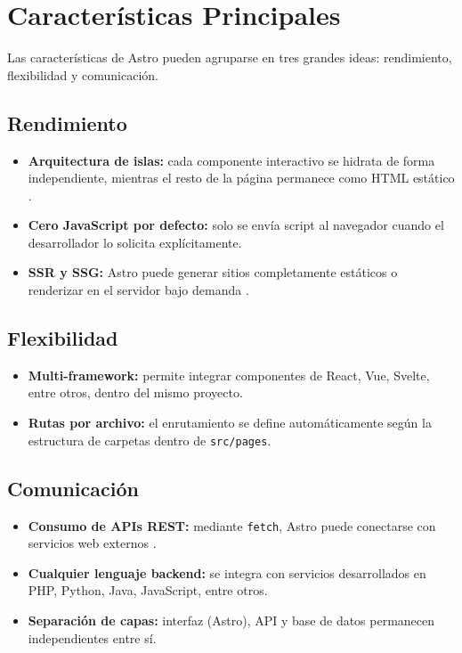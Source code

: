 \documentclass[12pt]{article}
\begin{document}
\section{Características Principales}

Las características de Astro pueden agruparse en tres grandes ideas: rendimiento, flexibilidad y comunicación.

\subsection{Rendimiento}

\begin{itemize}[leftmargin=*]
  \item \textbf{Arquitectura de islas:} cada componente interactivo se hidrata de forma independiente, mientras el resto de la página permanece como HTML estático \parencite{vepsalainen2023rise}.
  \item \textbf{Cero JavaScript por defecto:} solo se envía script al navegador cuando el desarrollador lo solicita explícitamente.
  \item \textbf{SSR y SSG:} Astro puede generar sitios completamente estáticos o renderizar en el servidor bajo demanda \parencite{iop2020rendering}.
\end{itemize}

\subsection{Flexibilidad}

\begin{itemize}[leftmargin=*]
  \item \textbf{Multi-framework:} permite integrar componentes de React, Vue, Svelte, entre otros, dentro del mismo proyecto.
  \item \textbf{Rutas por archivo:} el enrutamiento se define automáticamente según la estructura de carpetas dentro de \texttt{src/pages}.
\end{itemize}

\subsection{Comunicación}

\begin{itemize}[leftmargin=*]
  \item \textbf{Consumo de APIs REST:} mediante \texttt{fetch}, Astro puede conectarse con servicios web externos \parencite{fielding2002principled}.
  \item \textbf{Cualquier lenguaje backend:} se integra con servicios desarrollados en PHP, Python, Java, JavaScript, entre otros.
  \item \textbf{Separación de capas:} interfaz (Astro), API y base de datos permanecen independientes entre sí.
\end{itemize}
\end{document}
